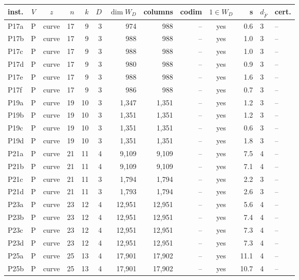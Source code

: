 \begin{tabular}{@{}lccrrrrrrcrll@{}}
\toprule
inst. & $V$ & $z$ & $n$ & $k$ & $D$ & $\dim W_D$ & columns & codim & $1\in W_D$ & s & $d_{\tilde F}$ & cert. \\
\midrule
P17a & P & curve & 17 & 9 & 3 & 974 & 988 & -- & yes & 0.6 & 3 & -- \\
P17b & P & curve & 17 & 9 & 3 & 988 & 988 & -- & yes & 1.0 & 3 & -- \\
P17c & P & curve & 17 & 9 & 3 & 988 & 988 & -- & yes & 1.0 & 3 & -- \\
P17d & P & curve & 17 & 9 & 3 & 980 & 988 & -- & yes & 0.9 & 3 & -- \\
P17e & P & curve & 17 & 9 & 3 & 988 & 988 & -- & yes & 1.6 & 3 & -- \\
P17f & P & curve & 17 & 9 & 3 & 986 & 988 & -- & yes & 0.7 & 3 & -- \\
P19a & P & curve & 19 & 10 & 3 & 1{,}347 & 1{,}351 & -- & yes & 1.2 & 3 & -- \\
P19b & P & curve & 19 & 10 & 3 & 1{,}351 & 1{,}351 & -- & yes & 1.2 & 3 & -- \\
P19c & P & curve & 19 & 10 & 3 & 1{,}351 & 1{,}351 & -- & yes & 0.6 & 3 & -- \\
P19d & P & curve & 19 & 10 & 3 & 1{,}351 & 1{,}351 & -- & yes & 1.8 & 3 & -- \\
P21a & P & curve & 21 & 11 & 4 & 9{,}109 & 9{,}109 & -- & yes & 7.5 & 4 & -- \\
P21b & P & curve & 21 & 11 & 4 & 9{,}109 & 9{,}109 & -- & yes & 7.1 & 4 & -- \\
P21c & P & curve & 21 & 11 & 3 & 1{,}794 & 1{,}794 & -- & yes & 2.2 & 3 & -- \\
P21d & P & curve & 21 & 11 & 3 & 1{,}793 & 1{,}794 & -- & yes & 2.6 & 3 & -- \\
P23a & P & curve & 23 & 12 & 4 & 12{,}951 & 12{,}951 & -- & yes & 5.6 & 4 & -- \\
P23b & P & curve & 23 & 12 & 4 & 12{,}951 & 12{,}951 & -- & yes & 7.4 & 4 & -- \\
P23c & P & curve & 23 & 12 & 4 & 12{,}951 & 12{,}951 & -- & yes & 7.3 & 4 & -- \\
P23d & P & curve & 23 & 12 & 4 & 12{,}951 & 12{,}951 & -- & yes & 7.3 & 4 & -- \\
P25a & P & curve & 25 & 13 & 4 & 17{,}901 & 17{,}902 & -- & yes & 11.1 & 4 & -- \\
P25b & P & curve & 25 & 13 & 4 & 17{,}901 & 17{,}902 & -- & yes & 10.7 & 4 & -- \\

\end{tabular}
